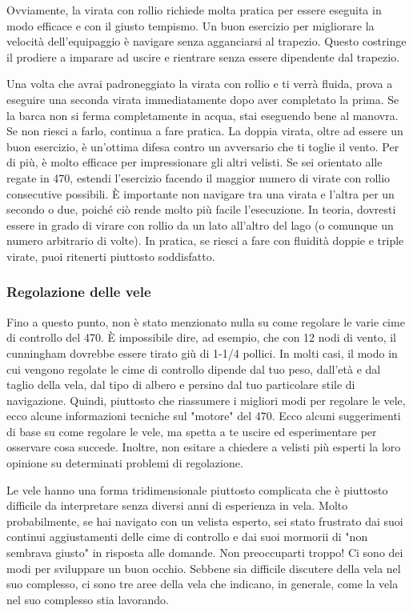 Ovviamente, la virata con rollio richiede molta pratica per essere eseguita in
modo efficace e con il giusto tempismo. Un buon esercizio per migliorare la
velocità dell'equipaggio è navigare senza agganciarsi al trapezio. Questo
costringe il prodiere a imparare ad uscire e rientrare senza essere dipendente
dal trapezio.

Una volta che avrai padroneggiato la virata con rollio e ti verrà fluida, prova a eseguire una
seconda virata immediatamente dopo aver completato la prima. Se la barca non si
ferma completamente in acqua, stai eseguendo bene al manovra. Se non riesci a
farlo, continua a fare pratica. La doppia virata, oltre ad essere un buon
esercizio, è un'ottima difesa contro un avversario che ti toglie il vento. Per
di più, è molto efficace per impressionare gli altri velisti. Se sei
orientato alle regate in 470, estendi l'esercizio facendo il maggior numero di
virate con rollio consecutive possibili. È importante non navigare tra una
virata e l'altra per un secondo o due, poiché ciò rende molto più facile
l'esecuzione. In teoria, dovresti essere in grado di virare con rollio da un lato
all'altro del lago (o comunque un numero arbitrario di volte). In pratica, se
riesci a fare con fluidità doppie e triple
virate, puoi ritenerti piuttosto soddisfatto.

\subsubsection{Regolazione delle vele}
\label{subsubsec:RegolazioneDelleVele}
Fino a questo punto, non è stato menzionato nulla su come regolare le varie cime
di controllo del 470. È impossibile dire, ad esempio, che con 12 nodi di vento,
il cunningham dovrebbe essere tirato giù di 1-1/4 pollici. In molti casi, il
modo in cui vengono regolate le cime di controllo dipende dal tuo peso, dall'età
e dal taglio della vela, dal tipo di albero e persino dal tuo particolare stile
di navigazione. Quindi, piuttosto che riassumere i migliori modi per regolare le
vele, ecco alcune informazioni tecniche sul "motore" del 470. Ecco alcuni
suggerimenti di base su come regolare le vele, ma spetta a te uscire ed
esperimentare per osservare cosa succede. Inoltre, non esitare a chiedere a
velisti più esperti la loro opinione su determinati problemi di regolazione.

Le vele hanno una forma tridimensionale piuttosto complicata che è piuttosto
difficile da interpretare senza diversi anni di esperienza in vela. Molto
probabilmente, se hai navigato con un velista esperto, sei stato frustrato dai
suoi continui aggiustamenti delle cime di controllo e dai suoi mormorii di "non
sembrava giusto" in risposta alle domande. Non preoccuparti troppo! Ci sono dei
modi per sviluppare un buon occhio. Sebbene sia difficile discutere della vela
nel suo complesso, ci sono tre aree della vela che indicano, in generale, come
la vela nel suo complesso stia lavorando.

